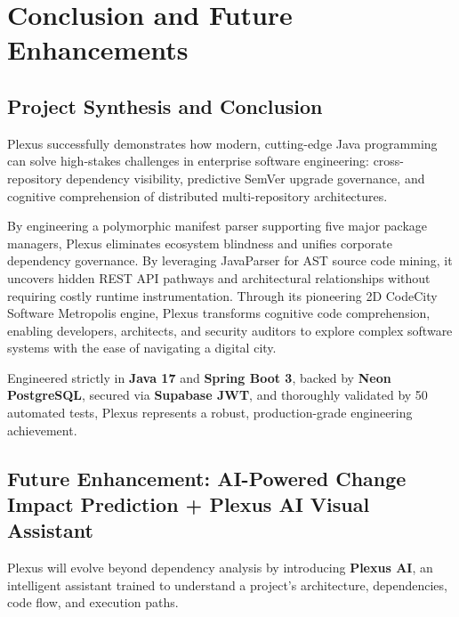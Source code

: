 \documentclass[11pt,a4paper,openany]{report}
\begin{document}
\chapter{Conclusion and Future Enhancements}

\section{Project Synthesis and Conclusion}
Plexus successfully demonstrates how modern, cutting-edge Java programming can solve high-stakes challenges in enterprise software engineering: cross-repository dependency visibility, predictive SemVer upgrade governance, and cognitive comprehension of distributed multi-repository architectures.

By engineering a polymorphic manifest parser supporting five major package managers, Plexus eliminates ecosystem blindness and unifies corporate dependency governance. By leveraging JavaParser for AST source code mining, it uncovers hidden REST API pathways and architectural relationships without requiring costly runtime instrumentation. Through its pioneering 2D CodeCity Software Metropolis engine, Plexus transforms cognitive code comprehension, enabling developers, architects, and security auditors to explore complex software systems with the ease of navigating a digital city.

Engineered strictly in \textbf{Java 17} and \textbf{Spring Boot 3}, backed by \textbf{Neon PostgreSQL}, secured via \textbf{Supabase JWT}, and thoroughly validated by 50 automated tests, Plexus represents a robust, production-grade engineering achievement.

\section{Future Enhancement: AI-Powered Change Impact Prediction + Plexus AI Visual Assistant}

Plexus will evolve beyond dependency analysis by introducing \textbf{Plexus AI}, an intelligent assistant trained to understand a project's architecture, dependencies, code flow, and execution paths.
\end{document}
